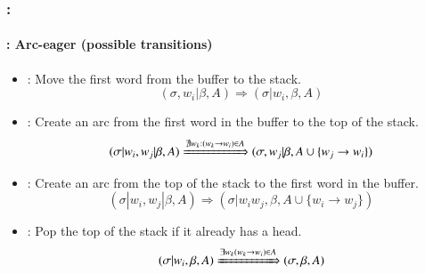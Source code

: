 \documentclass[xcolor=table]{beamer}
\begin{document}
\begin{frame}
	\frametitle{\insertshortsubtitle: \insertsection}
	\framesubtitle{\insertsubsection: Arc-eager (possible transitions)}

	\begin{itemize}
		\item {}: Move the first word from the buffer to the stack.
		\[ (\sigma, w_i|\beta, A) \Rightarrow  (\sigma|w_i, \beta, A) \]
		
		\item {}: Create an arc from the first word in the buffer to the top of the stack.
		\[ (\sigma|w_i, w_j|\beta, A) \xRightarrow{\nexists w_k : (w_k \rightarrow w_i) \in A}  (\sigma, w_j|\beta, A \cup \{w_j \rightarrow w_i \}) \] 
		
		\item {}: Create an arc from the top of the stack to the first word in the buffer.
		\[ (\sigma|w_i, w_j|\beta, A) \Rightarrow  (\sigma|w_i w_j, \beta, A \cup \{w_i \rightarrow w_j \}) \] 
		
		\item {}: Pop the top of the stack if it already has a head.
		\[ (\sigma|w_i, \beta, A) \xRightarrow{\exists w_k (w_k \rightarrow w_i) \in A} (\sigma, \beta, A) \] 
	\end{itemize}

\end{frame}
\end{document}
